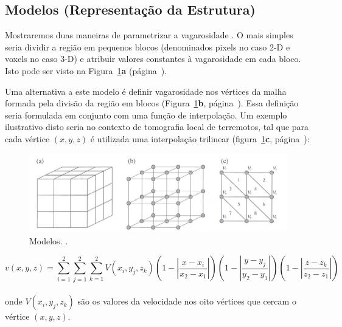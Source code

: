 \documentclass[a4paper, 12 pt]{article} %
\begin{document}
\newpage


\subsection{Modelos (Representação da Estrutura)}

Mostraremos duas maneiras de parametrizar a vagarosidade \citep{tempopercurso}. O mais simples seria dividir a região em pequenos blocos (denominados pixels no caso 2-D e voxels no caso 3-D) e atribuir valores constantes à vagarosidade em cada bloco. Isto pode ser visto na Figura~\ref{modelos}\textbf{a} (página~\pageref{modelos}). 

Uma alternativa a este modelo é definir vagarosidade nos vértices da malha formada pela divisão da região em blocos (Figura~\ref{modelos}\textbf{b}, página~\pageref{modelos}). Essa definição seria
formulada em conjunto com uma função de interpolação. Um exemplo ilustrativo disto seria no contexto de tomografia local de terremotos, tal que para cada vértice $(x, y, z)$ é utilizada uma interpolação trilinear (figura~\ref{modelos}\textbf{c}, página~\pageref{modelos}):

\begin{figure}[!hbtp]
	\begin{center}
		\includegraphics[scale=0.50]{Figuras/modelos.png}
	\end{center}
	\caption{Modelos. \cite{tempopercurso}.}
	\label{modelos}
\end{figure}

\begin{equation}\label{eq:estrutura}
v(x, y, z) = \sum_{i=1}^{2} \sum_{j=1}^{2} \sum_{k=1}^{2} V(x_{i}, y_{j}, z_{k})\left(1 - \left|\frac{x - x_{i}}{x_{2} - x_{1}}\right|\right)\left(1 - \left|\frac{y - y_{j}}{y_{2} - y_{1}}\right|\right)\left(1 - \left|\frac{z - z_{k}}{z_{2} - z_{1}}\right|\right)
\end{equation} \\
onde $V(x_{i}, y_{j}, z_{k})$ são os valores da velocidade nos oito vértices que cercam o vértice $(x, y, z)$.
\end{document}
